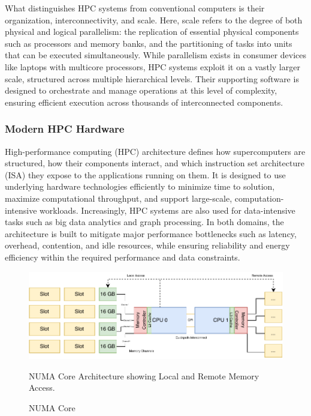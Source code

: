 What distinguishes HPC systems from conventional computers is their organization, interconnectivity, and scale. Here, scale refers to the degree of both physical and logical parallelism: the replication of essential physical components such as processors and memory banks, and the partitioning of tasks into units that can be executed simultaneously. While parallelism exists in consumer devices like laptops with multicore processors, HPC systems exploit it on a vastly larger scale, structured across multiple hierarchical levels. Their supporting software is designed to orchestrate and manage operations at this level of complexity, ensuring efficient execution across thousands of interconnected components.

\subsubsection{Modern HPC Hardware}
\label{sec:background_hpc_hardware}
High-performance computing (HPC) architecture defines how supercomputers are structured, how their components interact, and which instruction set architecture (ISA) they expose to the applications running on them. It is designed to use underlying hardware technologies efficiently to minimize time to solution, maximize computational throughput, and support large-scale, computation-intensive workloads. Increasingly, HPC systems are also used for data-intensive tasks such as big data analytics and graph processing. In both domains, the architecture is built to mitigate major performance bottlenecks such as latency, overhead, contention, and idle resources, while ensuring reliability and energy efficiency within the required performance and data constraints.

\begin{figure}[H]
    \centering
    \includegraphics[scale=0.9]{fig/02/02-numa-cores.pdf}
    \caption{NUMA Core}
    \label{fig:02-numa-cores}
    \tiny
    NUMA Core Architecture showing Local and Remote Memory Access.
\end{figure}

